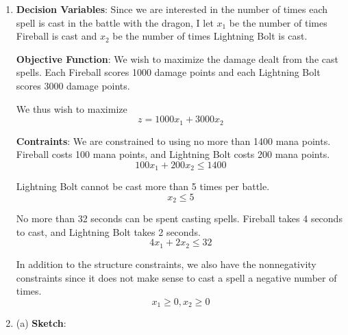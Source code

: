 \documentclass{article}
\begin{document}
  \pagebreak{}
  
  \begin{enumerate}
  \item 
  \textbf{Decision Variables}: Since we are interested in the number of times each spell is cast in the battle with the dragon,
  I let $x_1$ be the number of times Fireball is cast and $x_2$ be the number of times Lightning Bolt is cast. \newline{}
  
  \textbf{Objective Function}: We wish to maximize the damage dealt from the cast spells. 
  Each Fireball scores 1000 damage points and each Lightning Bolt scores 3000 damage points. \newline{}
  
  We thus wish to maximize
  $$z = 1000x_1 + 3000x_2$$
  
   \textbf{Contraints}: We are constrained to using no more than 1400 mana points. 
   Fireball costs 100 mana points, and Lightning Bolt costs 200 mana points.
   $$100x_1 +  200x_2 \le 1400$$
   
   Lightning Bolt cannot be cast more than 5 times per battle.
   $$x_2 \le 5$$
   
   No more than 32 seconds can be spent casting spells.
   Fireball takes 4 seconds to cast, and Lightning Bolt takes 2 seconds.
   $$4x_1 + 2x_2 \le 32$$
   
   In addition to the structure constraints, we also have the nonnegativity constraints since
   it does not make sense to cast a spell a negative number of times.
   $$x_1 \ge 0, x_2 \ge 0$$
   
   \item
   (a) \textbf{Sketch}: \newline{}
   
   \begin{center}
   \end{center}
   

\end{enumerate}
\end{document}
